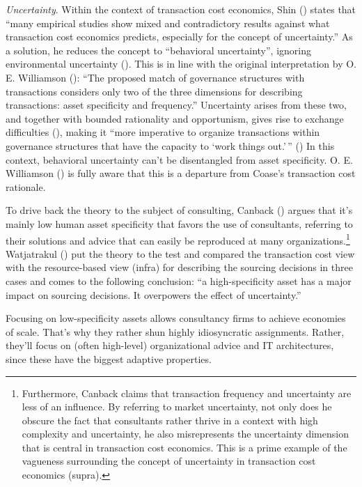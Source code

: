 \documentclass[
  man,floatsintext]{apa6}
\begin{document}
\emph{Uncertainty}. Within the context of transaction cost economics, Shin () states that ``many empirical studies show mixed and contradictory results against what transaction cost economics predicts, especially for the concept of uncertainty.'' As a solution, he reduces the concept to ``behavioral uncertainty'', ignoring environmental uncertainty (). This is in line with the original interpretation by O. E. Williamson (): ``The proposed match of governance structures with transactions considers only two of the three dimensions for describing transactions: asset specificity and frequency.'' Uncertainty arises from these two, and together with bounded rationality and opportunism, gives rise to exchange difficulties (), making it ``more imperative to organize transactions within governance structures that have the capacity to `work things out.'\,'' () In this context, behavioral uncertainty can't be disentangled from asset specificity. O. E. Williamson () is fully aware that this is a departure from Coase's transaction cost rationale.

To drive back the theory to the subject of consulting, Canback () argues that it's mainly low human asset specificity that favors the use of consultants, referring to their solutions and advice that can easily be reproduced at many organizations.\footnote{Furthermore, Canback claims that transaction frequency and uncertainty are less of an influence. By referring to market uncertainty, not only does he obscure the fact that consultants rather thrive in a context with high complexity and uncertainty, he also misrepresents the uncertainty dimension that is central in transaction cost economics. This is a prime example of the vagueness surrounding the concept of uncertainty in transaction cost economics (supra).} Watjatrakul () put the theory to the test and compared the transaction cost view with the resource-based view (infra) for describing the sourcing decisions in three cases and comes to the following conclusion: ``a high-specificity asset has a major impact on sourcing decisions. It overpowers the effect of uncertainty.''

Focusing on low-specificity assets allows consultancy firms to achieve economies of scale. That's why they rather shun highly idiosyncratic assignments. Rather, they'll focus on (often high-level) organizational advice and IT architectures, since these have the biggest adaptive properties.
\end{document}
